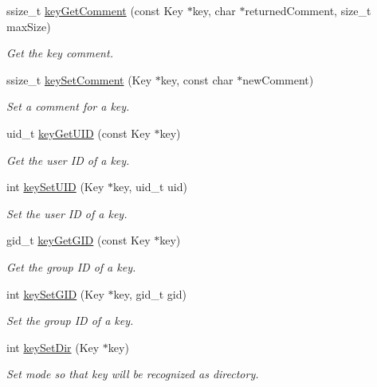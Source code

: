\begin{DoxyCompactItemize}
ssize\+\_\+t \hyperlink{group__meta_gafb89735689929ff717cc9f2d0d0b46a2}{key\+Get\+Comment} (const Key $\ast$key, char $\ast$returned\+Comment, size\+\_\+t max\+Size)
\begin{DoxyCompactList}\small\item\em Get the key comment. \end{DoxyCompactList}\item 
ssize\+\_\+t \hyperlink{group__meta_ga8863a877a84fa46e6017fe72e49b89c1}{key\+Set\+Comment} (Key $\ast$key, const char $\ast$new\+Comment)
\begin{DoxyCompactList}\small\item\em Set a comment for a key. \end{DoxyCompactList}\item 
uid\+\_\+t \hyperlink{group__meta_gacaa5060e67b03f50ae49a3620c54bc46}{key\+Get\+U\+I\+D} (const Key $\ast$key)
\begin{DoxyCompactList}\small\item\em Get the user I\+D of a key. \end{DoxyCompactList}\item 
int \hyperlink{group__meta_gab5f284f5ecd261e0a290095f50ba1af7}{key\+Set\+U\+I\+D} (Key $\ast$key, uid\+\_\+t uid)
\begin{DoxyCompactList}\small\item\em Set the user I\+D of a key. \end{DoxyCompactList}\item 
gid\+\_\+t \hyperlink{group__meta_ga46a95e81d7d7f4e3eb59e60e5f3738c0}{key\+Get\+G\+I\+D} (const Key $\ast$key)
\begin{DoxyCompactList}\small\item\em Get the group I\+D of a key. \end{DoxyCompactList}\item 
int \hyperlink{group__meta_ga9e3d0fb3f7ba906e067727b9155d22e3}{key\+Set\+G\+I\+D} (Key $\ast$key, gid\+\_\+t gid)
\begin{DoxyCompactList}\small\item\em Set the group I\+D of a key. \end{DoxyCompactList}\item 
int \hyperlink{group__meta_gaae575bd86a628a15ee45baa860522e75}{key\+Set\+Dir} (Key $\ast$key)
\begin{DoxyCompactList}\small\item\em Set mode so that key will be recognized as directory. \end{DoxyCompactList}\item 

\end{DoxyCompactItemize}
